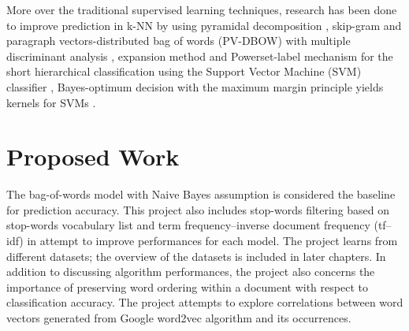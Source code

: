 \documentclass[a4paper, 11pt]{article}
\begin{document}
More over the traditional supervised learning techniques, research has been done to improve prediction in k-NN by using pyramidal decomposition \cite{heroux1998classification},  skip-gram and paragraph vectors-distributed bag of words (PV-DBOW) with multiple discriminant analysis \cite{lauren2018discriminant}, expansion method and Powerset-label mechanism for the short hierarchical classification using the Support Vector Machine (SVM) classifier \cite{salih2018term}, Bayes-optimum decision with the maximum margin principle yields kernels for SVMs \cite{ding2014sensing}.

\section{Proposed Work}
The bag-of-words model with Naive Bayes assumption is considered the baseline for prediction accuracy. This project also includes stop-words filtering based on stop-words vocabulary list and term frequency–inverse document frequency (tf–idf) in attempt to improve performances for each model. The project learns from different datasets; the overview of the datasets is included in later chapters. In addition to discussing algorithm performances, the project also concerns the importance of preserving word ordering within a document with respect to classification accuracy. The project attempts to explore correlations between word vectors generated from Google word2vec algorithm and its occurrences. 
\end{document}
